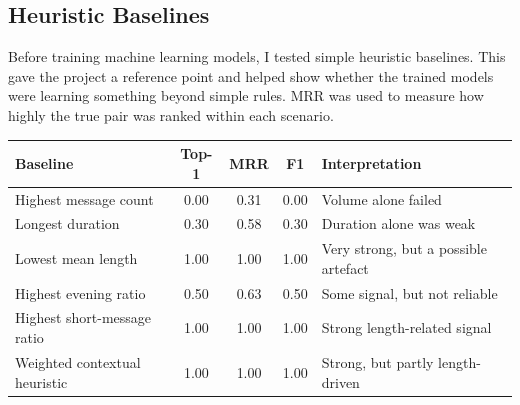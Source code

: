 \documentclass[10pt,a4paper]{article}
\begin{document}
\begin{multicols}{2}
\section{Heuristic Baselines}

Before training machine learning models, I tested simple heuristic baselines. This gave the project a reference point and helped show whether the trained models were learning something beyond simple rules. MRR was used to measure how highly the true pair was ranked within each scenario.

\end{multicols}
\begin{center}
\label{tab:baseline-results}
\renewcommand{\arraystretch}{1.15}
\small
\begin{tabularx}{0.96\textwidth}{Y C C C Y}
\toprule
{}\textbf{Baseline} & \textbf{Top-1} & \textbf{MRR} & \textbf{F1} & \textbf{Interpretation} \\
\midrule
Highest message count & 0.00 & 0.31 & 0.00 & Volume alone failed \\
Longest duration & 0.30 & 0.58 & 0.30 & Duration alone was weak \\
Lowest mean length & 1.00 & 1.00 & 1.00 & Very strong, but a possible artefact \\
Highest evening ratio & 0.50 & 0.63 & 0.50 & Some signal, but not reliable \\
Highest short-message ratio & 1.00 & 1.00 & 1.00 & Strong length-related signal \\
Weighted contextual heuristic & 1.00 & 1.00 & 1.00 & Strong, but partly length-driven \\
\bottomrule
\end{tabularx}
\end{center}
\end{document}
